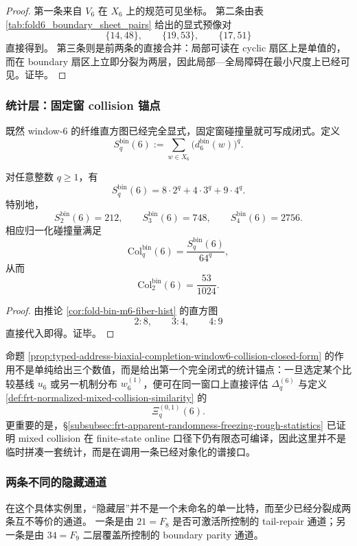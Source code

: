 \begin{proof}
第一条来自 \(V_6\) 在 \(X_6\) 上的规范可见坐标。
第二条由表 \ref{tab:fold6_boundary_sheet_pairs} 给出的显式预像对
\[
\{14,48\},\qquad \{19,53\},\qquad \{17,51\}
\]
直接得到。
第三条则是前两条的直接合并：局部可读在 cyclic 扇区上是单值的，而在 boundary 扇区上立即分裂为两层，因此局部—全局障碍在最小尺度上已经可见。证毕。
\end{proof}

\subsubsection{统计层：固定窗 collision 锚点}\label{subsubsec:typed-address-biaxial-completion-window6-collision-anchor}
既然 window-\(6\) 的纤维直方图已经完全显式，固定窗碰撞量就可写成闭式。定义
\[
S_q^{\mathrm{bin}}(6):=\sum_{w\in X_6}\bigl(d_6^{\mathrm{bin}}(w)\bigr)^q.
\]

\begin{proposition}\label{prop:typed-address-biaxial-completion-window6-collision-closed-form}
对任意整数 \(q\ge 1\)，有
\[
S_q^{\mathrm{bin}}(6)=8\cdot 2^q+4\cdot 3^q+9\cdot 4^q.
\]
特别地，
\[
S_2^{\mathrm{bin}}(6)=212,
\qquad
S_3^{\mathrm{bin}}(6)=748,
\qquad
S_4^{\mathrm{bin}}(6)=2756.
\]
相应归一化碰撞量满足
\[
\mathrm{Col}^{\mathrm{bin}}_q(6)=\frac{S_q^{\mathrm{bin}}(6)}{64^q},
\]
从而
\[
\mathrm{Col}^{\mathrm{bin}}_2(6)=\frac{53}{1024}.
\]
\end{proposition}

\begin{proof}
由推论 \ref{cor:fold-bin-m6-fiber-hist} 的直方图
\[
2:8,\qquad 3:4,\qquad 4:9
\]
直接代入即得。证毕。
\end{proof}

命题 \ref{prop:typed-address-biaxial-completion-window6-collision-closed-form} 的作用不是单纯给出三个数值，而是给出第一个完全闭式的统计锚点：一旦选定某个比较基线 \(u_6\) 或另一机制分布 \(w_6^{(1)}\)，便可在同一窗口上直接评估 \(\Delta_q^{(6)}\) 与定义 \ref{def:frt-normalized-mixed-collision-similarity} 的
\[
\Xi_q^{(0,1)}(6).
\]
更重要的是，\S\ref{subsubsec:frt-apparent-randomness-freezing-rough-statistics} 已证明 mixed collision 在 finite-state online 口径下仍有限态可编译，因此这里并不是临时拼凑一套统计，而是在调用一条已经对象化的谱接口。

\subsubsection{两条不同的隐藏通道}\label{subsubsec:typed-address-biaxial-completion-window6-two-hidden-channels}
在这个具体实例里，“隐藏层”并不是一个未命名的单一比特，而至少已经分裂成两条互不等价的通道。
一条是由 \(21=F_8\) 是否可激活所控制的 tail-repair 通道；另一条是由 \(34=F_9\) 二层覆盖所控制的 boundary parity 通道。

